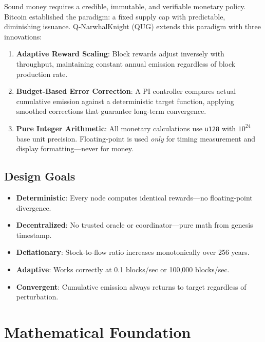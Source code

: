 \documentclass[11pt,a4paper]{article}
\begin{document}
Sound money requires a credible, immutable, and verifiable monetary policy. Bitcoin established the paradigm: a fixed supply cap with predictable, diminishing issuance. Q-NarwhalKnight (QUG) extends this paradigm with three innovations:

\begin{enumerate}[label=\textbf{\arabic*.}]
    \item \textbf{Adaptive Reward Scaling}: Block rewards adjust inversely with throughput, maintaining constant annual emission regardless of block production rate.
    \item \textbf{Budget-Based Error Correction}: A PI controller compares actual cumulative emission against a deterministic target function, applying smoothed corrections that guarantee long-term convergence.
    \item \textbf{Pure Integer Arithmetic}: All monetary calculations use \texttt{u128} with $10^{24}$ base unit precision. Floating-point is used \emph{only} for timing measurement and display formatting---never for money.
\end{enumerate}

\subsection{Design Goals}

\begin{itemize}
    \item \textbf{Deterministic}: Every node computes identical rewards---no floating-point divergence.
    \item \textbf{Decentralized}: No trusted oracle or coordinator---pure math from genesis timestamp.
    \item \textbf{Deflationary}: Stock-to-flow ratio increases monotonically over 256 years.
    \item \textbf{Adaptive}: Works correctly at 0.1 blocks/sec or 100,000 blocks/sec.
    \item \textbf{Convergent}: Cumulative emission always returns to target regardless of perturbation.
\end{itemize}

\section{Mathematical Foundation}
\end{document}
